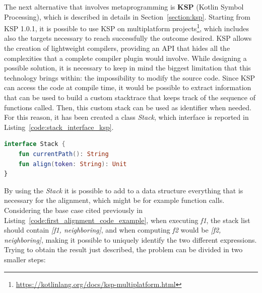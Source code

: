 The next alternative that involves metaprogramming is \textbf{KSP} (Kotlin Symbol Processing), which is described in details in Section~\ref{section:ksp}. Starting from KSP 1.0.1, it is possible to use KSP on multiplatform projects\footnote{\url{https://kotlinlang.org/docs/ksp-multiplatform.html}}, which includes also the targets necessary to reach successfully the outcome desired.\newline
KSP allows the creation of lightweight compilers, providing an API that hides all the complexities that a complete compiler plugin would involve. While designing a possible solution, it is necessary to keep in mind the biggest limitation that this technology brings within: the impossibility to modify the source code.\newline
Since KSP can access the code at compile time, it would be possible to extract information that can be used to build a custom stacktrace that keeps track of the sequence of functions called. Then, this custom stack can be used as identifier when needed. For this reason, it has been created a class \textit{Stack}, which interface is reported in Listing~\ref{code:stack_interface_ksp}.
\begin{lstlisting}[caption={Stack interface for KSP}, captionpos=b, language=Kotlin, label={code:stack_interface_ksp}]
interface Stack {
    fun currentPath(): String
    fun align(token: String): Unit
}
\end{lstlisting}
By using the \textit{Stack} it is possible to add to a data structure everything that is necessary for the alignment, which might be for example function calls. Considering the base case cited previously in Listing~\ref{code:first_alignment_code_example}, when executing \textit{f1}, the stack list should contain \textit{[f1, neighboring]}, and when computing \textit{f2} would be \textit{[f2, neighboring]}, making it possible to uniquely identify the two different expressions.\newline
Trying to obtain the result just described, the problem can be divided in two smaller steps:
